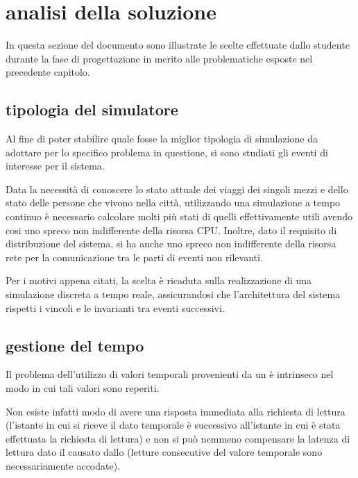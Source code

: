 %
\chapter*{analisi della soluzione}
\label{analisi-della-soluzione}
In questa sezione del documento sono illustrate le scelte effettuate dallo studente durante la fase di progettazione in merito alle problematiche esposte nel precedente capitolo.

\section*{tipologia del simulatore}
\label{analisi-della-soluzione-tipologia-del-simulatore}
Al fine di poter stabilire quale fosse la miglior tipologia di simulazione da adottare per lo specifico problema in questione, si sono studiati gli eventi di interesse per il sistema.

Data la necessità di conoscere lo stato attuale dei viaggi dei singoli mezzi e dello stato delle persone che vivono nella città, utilizzando una simulazione a tempo continuo è necessario calcolare molti più stati di quelli effettivamente utili avendo cosi uno spreco non indifferente della risorsa CPU. Inoltre, dato il requisito di distribuzione del sistema, si ha anche uno spreco non indifferente della risorsa rete per la comunicazione tra le parti di eventi non rilevanti.

Per i motivi appena citati, la scelta è ricaduta sulla realizzazione di una simulazione discreta a tempo reale, assicurandosi che l'architettura del sistema rispetti i vincoli e le invarianti tra eventi successivi.

\section*{gestione del tempo}
\label{analisi-della-soluzione-gestione-del-tempo}
Il problema dell'utilizzo di valori temporali provenienti da un  è intrinseco nel modo in cui tali valori sono reperiti.

Non esiste infatti modo di avere una risposta immediata alla richiesta di lettura (l'istante in cui si riceve il dato temporale è  successivo all'istante in cui è stata effettuata la richiesta di lettura) e non si può nemmeno compensare la latenza di lettura dato il  causato dallo  (letture consecutive del valore temporale sono necessariamente accodate).

